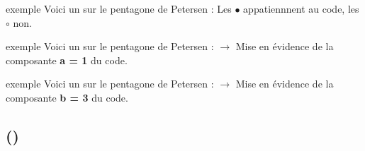 \documentclass{beamer}
\begin{document}
\begin{myframe}{exemple}
    Voici un  sur le pentagone de Petersen :
   Les $\bullet$ appatiennnent au code, les $\circ$ non.
\end{myframe}

\begin{myframe}{exemple}
    Voici un  sur le pentagone de Petersen :
   $\rightarrow$ Mise en \'evidence de la composante \textbf{a = 1} du code.
\end{myframe}

\begin{myframe}{exemple}
    Voici un  sur le pentagone de Petersen :
    $\rightarrow$ Mise en \'evidence de la composante \textbf{b = 3} du code.
\end{myframe}


\renewcommand{\subSecName}{\Sgs (\Snk)}
\subsection{\subSecName}
\end{document}
